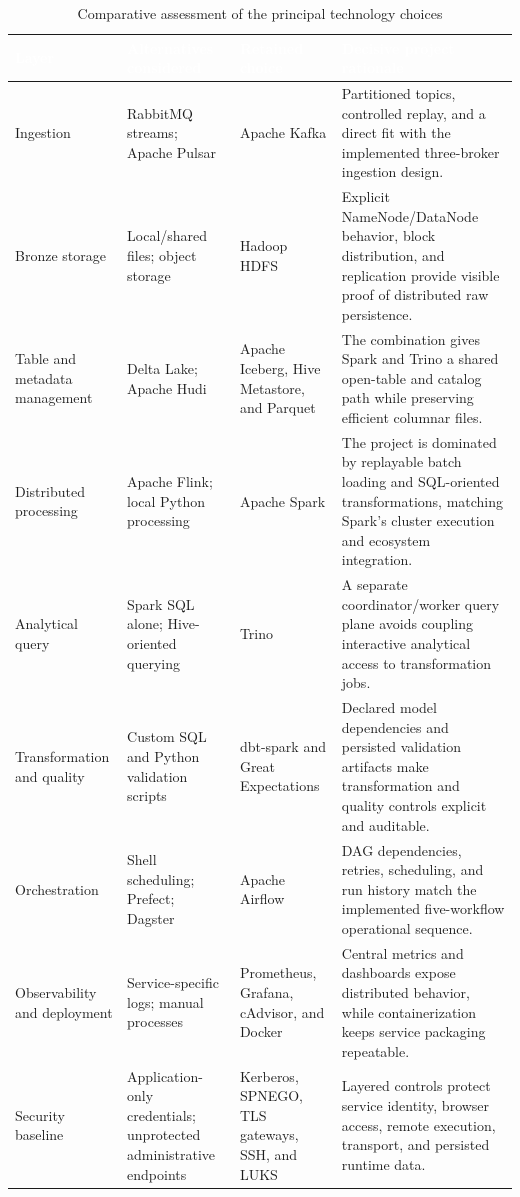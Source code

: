 \begin{table}[htbp]
    \centering
    \small
    \setlength{\tabcolsep}{4pt}
    \renewcommand{\arraystretch}{1.22}
    \begin{tabularx}{\textwidth}{|L{0.17\textwidth}|L{0.19\textwidth}|L{0.18\textwidth}|Y|}
        \hline
        \textcolor{white}{\textbf{Layer}} & \textcolor{white}{\textbf{Alternatives considered}} & \textcolor{white}{\textbf{Retained choice}} & \textcolor{white}{\textbf{Decisive project rationale}} \\
        \hline
        Ingestion & RabbitMQ streams; Apache Pulsar & Apache Kafka & Partitioned topics, controlled replay, and a direct fit with the implemented three-broker ingestion design. \\
        \hline
        Bronze storage & Local/shared files; object storage & Hadoop HDFS & Explicit NameNode/DataNode behavior, block distribution, and replication provide visible proof of distributed raw persistence. \\
        \hline
        Table and metadata management & Delta Lake; Apache Hudi & Apache Iceberg, Hive Metastore, and Parquet & The combination gives Spark and Trino a shared open-table and catalog path while preserving efficient columnar files. \\
        \hline
        Distributed processing & Apache Flink; local Python processing & Apache Spark & The project is dominated by replayable batch loading and SQL-oriented transformations, matching Spark's cluster execution and ecosystem integration. \\
        \hline
        Analytical query & Spark SQL alone; Hive-oriented querying & Trino & A separate coordinator/worker query plane avoids coupling interactive analytical access to transformation jobs. \\
        \hline
        Transformation and quality & Custom SQL and Python validation scripts & dbt-spark and Great Expectations & Declared model dependencies and persisted validation artifacts make transformation and quality controls explicit and auditable. \\
        \hline
        Orchestration & Shell scheduling; Prefect; Dagster & Apache Airflow & DAG dependencies, retries, scheduling, and run history match the implemented five-workflow operational sequence. \\
        \hline
        Observability and deployment & Service-specific logs; manual processes & Prometheus, Grafana, cAdvisor, and Docker & Central metrics and dashboards expose distributed behavior, while containerization keeps service packaging repeatable. \\
        \hline
        Security baseline & Application-only credentials; unprotected administrative endpoints & Kerberos, SPNEGO, TLS gateways, SSH, and LUKS & Layered controls protect service identity, browser access, remote execution, transport, and persisted runtime data. \\
        \hline
    \end{tabularx}
    \caption{Comparative assessment of the principal technology choices}
    \label{tab:chapter3-comparative-assessment}
\end{table}
\FloatBarrier

